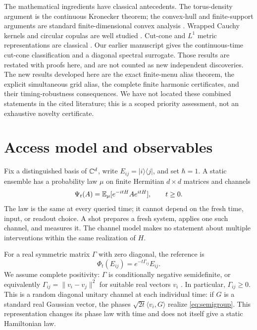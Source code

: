 \documentclass[11pt,a4paper]{article}
\theoremstyle{remark}\newtheorem{remark}[theorem]{Remark}
\begin{document}
The mathematical ingredients have classical antecedents. The torus-density
argument is the continuous Kronecker theorem; the convex-hull and
finite-support arguments are standard finite-dimensional convex analysis
\cite{vdh,rockafellar}. Wrapped Cauchy kernels and circular copulas are
well studied \cite{kato}. Cut-cone and $L^1$ metric representations are
classical \cite{deza}. Our earlier manuscript \cite{parent} gives the
continuous-time cut-cone classification and a diagonal spectral surrogate.
Those results are restated with proofs here, and are not counted as new
independent discoveries. The new results developed here are the exact
finite-menu alias theorem, the explicit simultaneous grid alias, the
complete finite harmonic certificates, and their timing-robustness
consequences. We have not located these combined statements in the cited
literature; this is a scoped priority assessment, not an exhaustive
novelty certificate.

\section{Access model and observables}\label{sec:model}
Fix a distinguished basis of $\mathbb C^d$, write $E_{ij}=|i\rangle\langle j|$,
and set $\hbar=1$. A static ensemble has a probability law $\mu$ on
finite Hermitian $d\times d$ matrices and channels
\begin{equation}\label{eq:static}
 \Psi_t(A)=\mathbb E_\mu[e^{-itH}A e^{itH}],\qquad t\geq0.
\end{equation}
The law is the same at every queried time; it cannot depend on the fresh
time, input, or readout choice. A shot prepares a fresh system, applies
one such channel, and measures it. The channel model makes no statement
about multiple interventions within the same realization of $H$.

For a real symmetric matrix $\Gamma$ with zero diagonal, the reference is
\begin{equation}\label{eq:semigroup}
 \Phi_t(E_{ij})=e^{-t\Gamma_{ij}}E_{ij}.
\end{equation}
We assume complete positivity: $\Gamma$ is conditionally negative
semidefinite, or equivalently $\Gamma_{ij}=\|v_i-v_j\|^2$ for suitable
real vectors $v_i$ \cite{schoenberg}. In particular, $\Gamma_{ij}\geq0$.
This is a random diagonal unitary channel at each individual time:
if $G$ is a standard real Gaussian vector, the phases
$\sqrt{2t}\langle v_i,G\rangle$ realize \eqref{eq:semigroup}.
This representation changes its phase law with time and does not itself
give a static Hamiltonian law.
\end{document}
